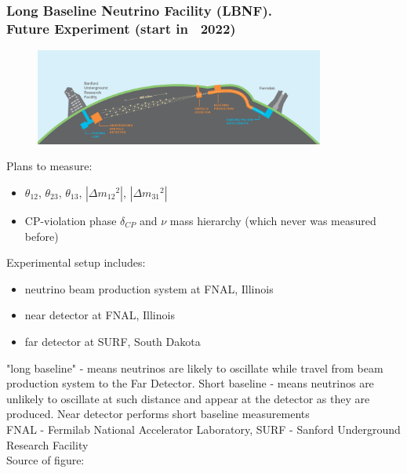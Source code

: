 \begin{frame}\frametitle{Long Baseline Neutrino Facility (LBNF). \\ Future Experiment (start in ~2022)}
\scriptsize
\begin{figure}
\label{fig:LBNF_overallScheme}
\centering
\includegraphics[width=0.85\textwidth, keepaspectratio=true]{figs/LBNF_overallScheme.png} 
\end{figure}
Plans to measure:
\begin{itemize}
     \item $\theta_{12}$, $\theta_{23}$, $\theta_{13}$, $|\Delta{m_{12}}^2|$, $|\Delta{m_{31}}^2|$
     \item CP-violation phase $\delta_{CP}$ and $\nu$ mass hierarchy (which never was measured before)
\end{itemize}
Experimental setup includes:  
\begin{itemize}
  \item neutrino beam production system at FNAL, Illinois 
  \item near detector at FNAL, Illinois 
  \item far detector at SURF, South Dakota
\end{itemize}
\tiny
"long baseline" - means neutrinos are likely to oscillate while travel from beam production system to the Far Detector. Short baseline - means neutrinos are unlikely to oscillate at such distance and appear at the detector as they are produced. Near detector performs short baseline measurements\\
FNAL - Fermilab National Accelerator Laboratory, SURF - Sanford Underground Research Facility\\
Source of figure: \cite{ref_LBNFweb} 
\end{frame}

